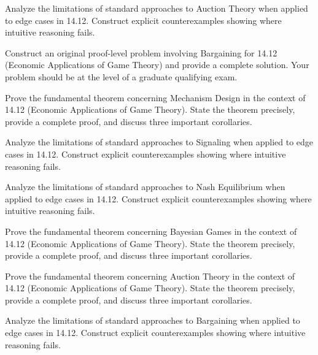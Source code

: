 \documentclass[12pt,a4paper]{exam}
\begin{document}
\begin{questions}
\vspace{0.3cm}

\question[2]
Analyze the limitations of standard approaches to Auction Theory when applied to edge cases in 14.12. Construct explicit counterexamples showing where intuitive reasoning fails.

\vspace{0.3cm}

\question[3]
Construct an original proof-level problem involving Bargaining for 14.12 (Economic Applications of Game Theory) and provide a complete solution. Your problem should be at the level of a graduate qualifying exam.

\vspace{0.3cm}

\question[5]
Prove the fundamental theorem concerning Mechanism Design in the context of 14.12 (Economic Applications of Game Theory). State the theorem precisely, provide a complete proof, and discuss three important corollaries.

\vspace{0.3cm}

\question[5]
Analyze the limitations of standard approaches to Signaling when applied to edge cases in 14.12. Construct explicit counterexamples showing where intuitive reasoning fails.

\vspace{0.3cm}

\question[6]
Analyze the limitations of standard approaches to Nash Equilibrium when applied to edge cases in 14.12. Construct explicit counterexamples showing where intuitive reasoning fails.

\vspace{0.3cm}

\question[5]
Prove the fundamental theorem concerning Bayesian Games in the context of 14.12 (Economic Applications of Game Theory). State the theorem precisely, provide a complete proof, and discuss three important corollaries.

\vspace{0.3cm}

\question[4]
Prove the fundamental theorem concerning Auction Theory in the context of 14.12 (Economic Applications of Game Theory). State the theorem precisely, provide a complete proof, and discuss three important corollaries.

\vspace{0.3cm}

\question[2]
Analyze the limitations of standard approaches to Bargaining when applied to edge cases in 14.12. Construct explicit counterexamples showing where intuitive reasoning fails.


\end{questions}
\end{document}
